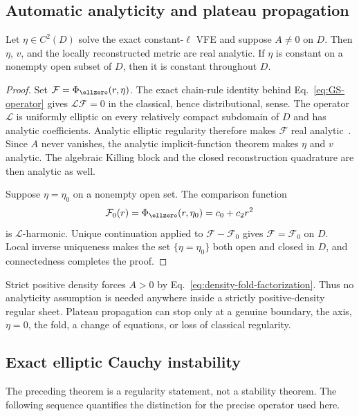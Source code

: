\subsection{Automatic analyticity and plateau propagation}

\begin{theorem}
\label{thm:automatic-analyticity}
Let $\eta\in C^2(D)$ solve the exact constant-$\ell$ VFE and suppose
$A\neq0$ on $D$. Then $\eta$, $v$, and the locally reconstructed metric are
real analytic. If $\eta$ is constant on a nonempty open subset of $D$, then
it is constant throughout $D$.
\end{theorem}

\begin{proof}
Set $\mathcal F=\Phi_{\ellzero}(r,\eta)$. The exact chain-rule identity
behind Eq.~\eqref{eq:GS-operator} gives $\mathcal L\mathcal F=0$ in the
classical, hence distributional, sense. The operator $\mathcal L$ is
uniformly elliptic on every relatively compact subdomain of $D$ and has
analytic coefficients. Analytic elliptic regularity therefore makes
$\mathcal F$ real analytic~\cite{MorreyNirenberg1957CPAM}. Since $A$ never
vanishes, the analytic implicit-function theorem makes $\eta$ and $v$
analytic. The algebraic Killing block and the closed reconstruction
quadrature are then analytic as well.

Suppose $\eta=\eta_0$ on a nonempty open set. The comparison function
$$
\mathcal F_0(r)=\Phi_{\ellzero}(r,\eta_0)=c_0+c_2r^2
$$
is $\mathcal L$-harmonic. Unique continuation applied to
$\mathcal F-\mathcal F_0$ gives $\mathcal F=\mathcal F_0$ on $D$. Local
inverse uniqueness makes the set $\{\eta=\eta_0\}$ both open and closed in
$D$, and connectedness completes the proof.
\end{proof}

Strict positive density forces $A>0$ by
Eq.~\eqref{eq:density-fold-factorization}. Thus no analyticity assumption is
needed anywhere inside a strictly positive-density regular sheet. Plateau
propagation can stop only at a genuine boundary, the axis, $\eta=0$, the
fold, a change of equations, or loss of classical regularity.

\subsection{Exact elliptic Cauchy instability}

The preceding theorem is a regularity statement, not a stability theorem.
The following sequence quantifies the distinction for the precise operator
used here.

